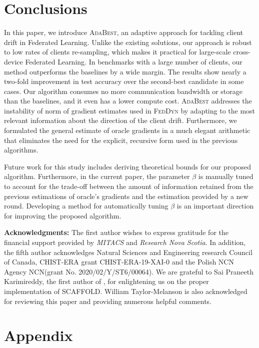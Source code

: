 \documentclass[runningheads]{llncs}
\newcommand{\scaffold}{\textsc{SCAFFOLD}\xspace}
\newcommand{\feddyn}{\textsc{FedDyn}\xspace}
\newcommand{\ours}{\textsc{AdaBest}\xspace}
\begin{document}
\label{sec:experiments}

\section{Conclusions}
In this paper, we introduce \ours, an adaptive approach for tackling client drift in Federated Learning. Unlike the existing solutions, our approach is robust to low rates of clients re-sampling, which makes it practical for large-scale cross-device Federated Learning. 
In benchmarks with a large number of clients, our method outperforms the baselines by a wide margin. 
The results show nearly a two-fold improvement in test accuracy over the second-best candidate in some cases.
Our algorithm consumes no more communication bandwidth or storage than the baselines, and it even has a lower compute cost. \ours addresses the instability of norm of gradient estimates used in \feddyn by adapting to the most relevant information about the direction of the client drift. Furthermore, we formulated the general estimate of oracle gradients in a much elegant arithmetic that eliminates the need for the explicit, recursive form used in the previous algorithms.

Future work for this study includes deriving theoretical bounds for our proposed algorithm. Furthermore, in the current paper, the parameter $\beta$ is manually tuned to account for the trade-off between the amount of information retained from the previous estimations of oracle's gradients and the estimation provided by a new round. Developing a method for automatically tuning $\beta$ is an important direction for improving the proposed algorithm.

\smallskip \noindent \textbf{Acknowledgments: } 
The first author wishes to express gratitude for the financial support provided by \emph{MITACS} and \emph{Research Nova Scotia}.
In addition, the fifth author acknowledges Natural Sciences and Engineering research Council of Canada, CHIST-ERA grant CHIST-ERA-19-XAI-0 and the Polish NCN Agency NCN(grant No. 2020/02/Y/ST6/00064). We are grateful to Sai Praneeth Karimireddy, the first author of \cite{karimireddy2020scaffold}, for enlightening us on the proper implementation of \scaffold. William Taylor-Melanson is also acknowledged for reviewing this paper and providing numerous helpful comments.



\clearpage



\clearpage
\section*{Appendix}
\setcounter{remark}{0}
\setcounter{theorem}{0}
\setcounter{figure}{3}
\setcounter{table}{2}
\setcounter{algorithm}{1}
\setcounter{section}{0}
\renewcommand{\thesection}{\Alph{section}}
\end{document}
